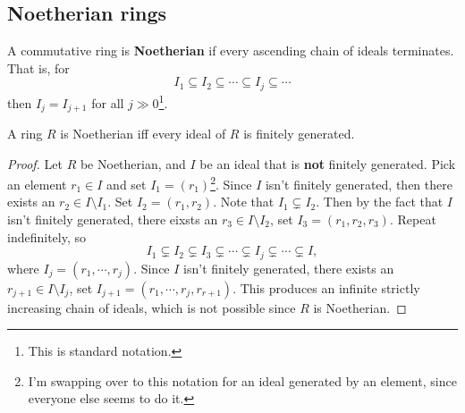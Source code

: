 \subsection{Noetherian rings}
\begin{definition}
   A commutative ring is \textbf{Noetherian} if every ascending chain of ideals terminates. That is, for \[
   I_1 \subseteq I_2\subseteq \cdots \subseteq I_j \subseteq \cdots 
   \] then $I_j =I_{j+1}$ for all $j\gg 0$\footnote{This is standard notation.}.
\end{definition}
\begin{prop}
    A ring $R$ is Noetherian iff every ideal of $R$ is finitely generated.
\end{prop}
\begin{proof}
    Let $R$ be Noetherian, and $I$ be an ideal that is \textbf{not} finitely generated. Pick an element $r_1\in I$ and set $I_1=(r_1)$\footnote{I'm swapping over to this notation for an ideal generated by an element, since everyone else seems to do it.}. Since $I$ isn't finitely generated, then there exists an $r_2\in I \setminus I_1$. Set $I_2=(r_1,r_2)$. Note that $I_1 \subsetneq I_2$. Then by the fact that $I$ isn't finitely generated, there eixsts an $r_3\in I \setminus I_2$, set $I_3=(r_1,r_2,r_3)$. Repeat indefinitely, so \[
    I_1 \subsetneq I_2 \subsetneq I_3 \subsetneq \cdots \subsetneq I_j  \subsetneq \cdots \subsetneq I,
\] where $I_j =(r_1,\cdots,r_j )$. Since $I$ isn't finitely generated, there exists an $r_{j+1}\in I \setminus I_j $, set $I_{j+1}=(r_1,\cdots ,r_j ,r_{r+1})$. This produces an infinite strictly increasing chain of ideals, which is not possible since $R$ is Noetherian.
\end{proof}
